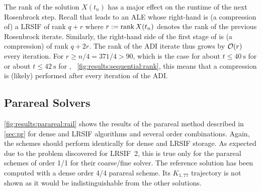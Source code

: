 The rank of the solution $X(t_n)$ has a major effect on the runtime of the next Rosenbrock step.
Recall that  leads to an \ac{ALE} whose right-hand is (a compression of) a \ac{LRSIF} of rank $q+r$
where $r := \operatorname{rank} X(t_n)$ denotes the rank of the previous Rosenbrock iterate.
Similarly, the right-hand side of the first stage of  is (a compression) of rank $q + 2r$.
The rank of the \ac{ADI} iterate thus grows by $\operatorname{\mathcal O}(r)$ every iteration.
For $r \geq n/4 = 371/4 > 90$,
which is the case for about $t \leq \SI{40}{\second}$ for 
or about $t \leq \SI{42}{\second}$ for ,
\cf~\autoref{fig:results:sequential:rank},
this means that a compression is (likely) performed after every iteration of the \ac{ADI}.

\subsection{Parareal Solvers}
\label{sec:results:parareal}

\autoref{fig:results:parareal:rail} shows the results of the parareal method described in \autoref{sec:pr}
for dense and \ac{LRSIF} algorithms and several order combinations.
Again, the schemes should perform identically for dense and \ac{LRSIF} storage.
As expected due to the problem discovered for \ac{LRSIF}~2,
this is true only for the parareal schemes of order 1/1 for their coarse/fine solver.
The reference solution has been computed with a dense order 4/4 parareal scheme.
Its $K_{1,77}$ trajectory is not shown as it would be indistinguishable from the other solutions.

